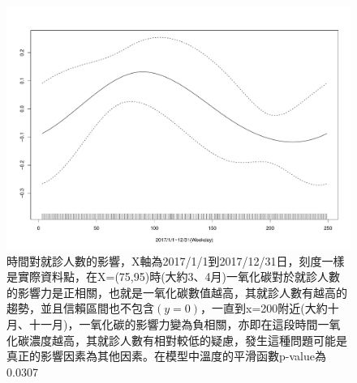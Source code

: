 \documentclass[a4paper, 12pt]{article}
\begin{document}
\clearpage
\begin{figure}
       \includegraphics[width=13cm]{CO_time.pdf}
       \caption{\label{}時間對就診人數的影響，X軸為2017/1/1到2017/12/31日，刻度一樣是實際資料點，在X=(75,95)時(大約3、4月)一氧化碳對於就診人數的影響力是正相關，也就是一氧化碳數值越高，其就診人數有越高的趨勢，並且信賴區間也不包含$(y=0)$，一直到x=200附近(大約十月、十一月)，一氧化碳的影響力變為負相關，亦即在這段時間一氧化碳濃度越高，其就診人數有相對較低的疑慮，發生這種問題可能是真正的影響因素為其他因素。在模型中溫度的平滑函數p-value為0.0307}
\end{figure}
\end{document}
